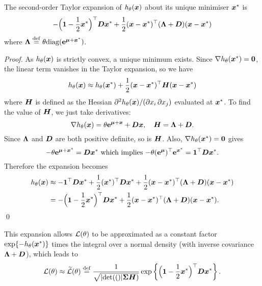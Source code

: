 \begin{proposition}\label{P:htheta}
The second-order Taylor expansion of $h_\theta(\bm{x})$ about its unique minimiser $\bm{x}^*$ is
\[ - \Big(\bm{1} - \frac12 \bm{x}^* \Big)^\top \bm{D} \bm{x}^*
 + \frac12 (\bm{x} - \bm{x}^*)^\top (\bm{\Lambda} + \bm{D}) (\bm{x} - \bm{x}^*) \]
where $\bm{\Lambda} \overset{\mathrm{def}}{=} \theta  \mathrm{diag}(\bm{\mathrm{e}}^{\bm{\mu} + \bm{x}^*})$.
\end{proposition}

\begin{proof}
As $h_\theta(\bm{x})$ is strictly convex, a unique minimum exists. Since $\nabla
h_\theta(\bm{x}^*) = \bm{0}$, the linear term vanishes in the Taylor expansion,
so we have
%
\[ h_\theta(\bm{x}) \approx h_\theta(\bm{x}^*)
  + \frac12 (\bm{x} - \bm{x}^*)^\top \bm{H} (\bm{x} - \bm{x}^*) \]
%
where $\bm{H}$ is defined as the Hessian $\partial^2 h_\theta(\bm{x}) / ( \partial
x_i \, \partial x_j )$ evaluated at $\bm{x}^*$.  To find the value of $\bm{H}$, we
just take derivatives:
%
\[ \nabla h_\theta(\bm{x}) = \theta \bm{\mathrm{e}}^{\bm{\mu} + \bm{x}} + \bm{D} \bm{x},
  \quad \bm{H} = \bm{\Lambda} + \bm{D}. \]
%
Since $\bm{\Lambda}$ and $\bm{D}$ are both positive definite, so is $\bm{H}$. Also,
$\nabla h_\theta(\bm{x}^*) = \bm{0}$ gives
\begin{equation} \label{grad_zero_subs}
    {-}\theta \bm{\mathrm{e}}^{\bm{\mu} + \bm{x}^*} = \bm{D} \bm{x}^* \text{ which implies }
  {-}\theta (\bm{\mathrm{e}}^{\bm{\mu}})^\top \bm{\mathrm{e}}^{\bm{x}^*} = \bm{1}^\top \bm{D} \bm{x}^*.
\end{equation}
Therefore the expansion becomes
\begin{align*}
	h_\theta(\bm{x}) &\approx -\bm{1}^\top \bm{D} \bm{x}^*
 + \frac12 (\bm{x}^*)^\top \bm{D} \bm{x}^*
 + \frac12 (\bm{x} - \bm{x}^*)^\top (\bm{\Lambda} + \bm{D}) (\bm{x} - \bm{x}^*) \\
	&= - \Big(\bm{1} - \frac12 \bm{x}^* \Big)^\top \bm{D} \bm{x}^*
 + \frac12 (\bm{x} - \bm{x}^*)^\top (\bm{\Lambda} + \bm{D}) (\bm{x} - \bm{x}^*).
\end{align*}
\qed
\end{proof}

This expansion allows $\mathcal{L}(\theta)$ to be approximated as a constant
factor $\exp\{-h_\theta(\bm{x}^*)\}$ times the integral over a normal density
(with inverse covariance $\bm{\Lambda} + \bm{D}$), which leads to
\[
	\mathcal{L}(\theta) \approx \widetilde{\mathcal{L}}(\theta)
 \overset{\mathrm{def}}{=} \frac{1}{\sqrt{\lvert \mathrm{det}(() \rvert\bm{\Sigma} \bm{H})}}
  \exp\left\{ \Big(\bm{1} - \frac12 \bm{x}^* \Big)^\top \bm{D} \bm{x}^* \right\}.
\]

